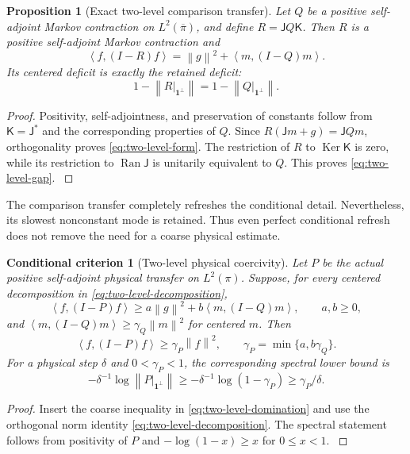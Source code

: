 \documentclass[11pt,oneside,openany]{book}
\newtheorem{proposition}[proposition]{Proposition}
\newtheorem{criterion}[criterion]{Conditional criterion}
\theoremstyle{definition}
\theoremstyle{remark}
\newcommand{\one}{\mathbf1}
\newcommand{\Ran}{\operatorname{Ran}}
\newcommand{\Ker}{\operatorname{Ker}}
\newcommand{\norm}[1]{\left\lVert#1\right\rVert}
\newcommand{\ip}[2]{\left\langle#1,#2\right\rangle}
\newcommand{\src}[2]{\cite[#2]{#1}}
\begin{document}
\begin{proposition}[Exact two-level comparison transfer]
\label{prop:two-level-transfer}
Let $Q$ be a positive self-adjoint Markov contraction on
$L^2(\overline\pi)$, and define $R=\mathsf JQ\mathsf K$.
Then $R$ is a positive self-adjoint Markov contraction and
\begin{equation}\label{eq:two-level-form}
\ip{f}{(I-R)f}=\norm g^2+\ip{m}{(I-Q)m}.
\end{equation}
Its centered deficit is exactly the retained deficit:
\begin{equation}\label{eq:two-level-gap}
1-\norm{R|_{\one^\perp}}
=1-\norm{Q|_{\one^\perp}}.
\end{equation}
\end{proposition}
\begin{proof}
Positivity, self-adjointness, and preservation of constants follow
from $\mathsf K=\mathsf J^*$ and the corresponding properties of $Q$.
Since $R(\mathsf Jm+g)=\mathsf JQm$, orthogonality proves
\cref{eq:two-level-form}. The restriction of $R$ to $\Ker\mathsf K$
is zero, while its restriction to $\Ran\mathsf J$ is unitarily
equivalent to $Q$. This proves \cref{eq:two-level-gap}.
\src{F6}{V56}
\end{proof}

The comparison transfer completely refreshes the conditional detail.
Nevertheless, its slowest nonconstant mode is retained. Thus even
perfect conditional refresh does not remove the need for a coarse
physical estimate.

\begin{criterion}[Two-level physical coercivity]
\label{crit:two-level-physical}
Let $P$ be the actual positive self-adjoint physical transfer on
$L^2(\pi)$. Suppose, for every centered decomposition in
\cref{eq:two-level-decomposition},
\begin{equation}\label{eq:two-level-domination}
\ip{f}{(I-P)f}\ge
 a\norm g^2+b\ip{m}{(I-Q)m},
\qquad a,b\ge0,
\end{equation}
and $\ip{m}{(I-Q)m}\ge\gamma_Q\norm m^2$ for centered $m$.
Then
\begin{equation}\label{eq:two-level-physical-gap}
\ip{f}{(I-P)f}\ge\gamma_P\norm f^2,
\qquad \gamma_P=\min\{a,b\gamma_Q\}.
\end{equation}
For a physical step $\delta$ and $0<\gamma_P<1$, the corresponding
spectral lower bound is
\begin{equation}\label{eq:two-level-physical-mass}
-\delta^{-1}\log\norm{P|_{\one^\perp}}
\ge-\delta^{-1}\log(1-\gamma_P)
\ge\gamma_P/\delta.
\end{equation}
\end{criterion}
\begin{proof}
Insert the coarse inequality in \cref{eq:two-level-domination} and
use the orthogonal norm identity \cref{eq:two-level-decomposition}.
The spectral statement follows from positivity of $P$ and
$-\log(1-x)\ge x$ for $0\le x<1$. \src{F6}{V56}
\end{proof}
\end{document}
